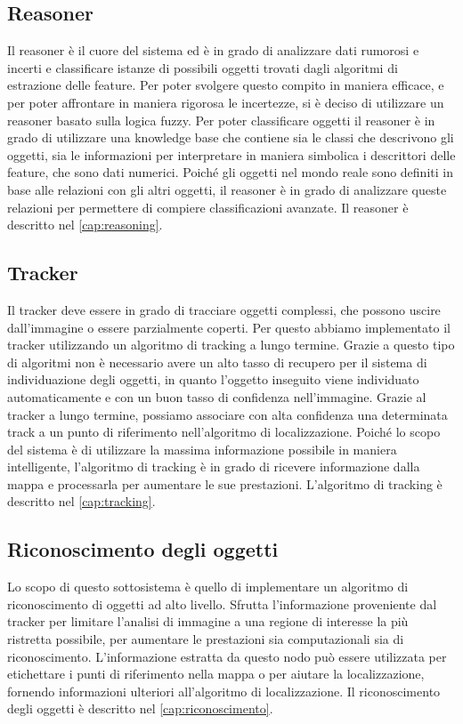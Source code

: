 \subsection{Reasoner}
Il reasoner è il cuore del sistema ed è in grado di analizzare dati rumorosi e incerti e classificare istanze di possibili oggetti trovati dagli algoritmi di estrazione delle feature. Per poter svolgere questo compito in maniera efficace, e per poter affrontare in maniera rigorosa le incertezze, si è deciso di utilizzare un reasoner basato sulla logica fuzzy.
Per poter classificare oggetti il reasoner è in grado di utilizzare una knowledge base che contiene sia le classi che descrivono gli oggetti, sia le informazioni per interpretare in maniera simbolica i descrittori delle feature, che sono dati numerici. 
Poiché gli oggetti nel mondo reale sono definiti in base alle relazioni con gli altri oggetti, il reasoner è in grado di analizzare queste relazioni per permettere di compiere classificazioni avanzate.
Il reasoner è descritto nel \autoref{cap:reasoning}.

\subsection{Tracker}
Il tracker deve essere in grado di tracciare oggetti complessi, che possono uscire dall'immagine o essere parzialmente coperti. Per questo abbiamo implementato il tracker utilizzando un algoritmo di tracking a lungo termine. Grazie a questo tipo di algoritmi non è necessario avere un alto tasso di recupero per il sistema di individuazione degli oggetti, in quanto l'oggetto inseguito viene individuato automaticamente e con un buon tasso di confidenza nell'immagine. Grazie al tracker a lungo termine, possiamo associare con alta confidenza una determinata track a un punto di riferimento nell'algoritmo di localizzazione.
Poiché lo scopo del sistema è di utilizzare la massima informazione possibile in maniera intelligente, l'algoritmo di tracking è in grado di ricevere informazione dalla mappa e processarla per aumentare le sue prestazioni.
L'algoritmo di tracking è descritto nel \autoref{cap:tracking}.


\subsection{Riconoscimento degli oggetti}
Lo scopo di questo sottosistema è quello di implementare un algoritmo di riconoscimento di oggetti ad alto livello. Sfrutta l'informazione proveniente dal tracker per limitare l'analisi di immagine a una regione di interesse la più ristretta possibile, per aumentare le prestazioni sia computazionali sia di riconoscimento. L'informazione estratta da questo nodo può essere utilizzata per etichettare i punti di riferimento nella mappa o per aiutare la localizzazione, fornendo informazioni ulteriori all'algoritmo di localizzazione.
Il riconoscimento degli oggetti è descritto nel \autoref{cap:riconoscimento}.

